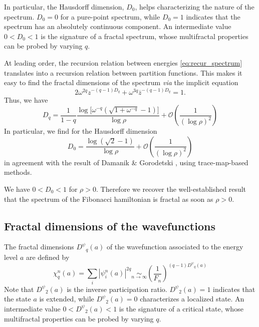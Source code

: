 \documentclass[aps,prl,preprint]{revtex4-1}
\newcommand{\simlim}[2]{\ensuremath{ \underset{#1 \rightarrow #2}{\sim} }}
\newcommand{\zb}{\ensuremath{\overline{z}}}
\newcommand{\wf}{\ensuremath{D^\psi}}
\begin{document}
In particular, the Hausdorff dimension, $D_0$, helps characterizing the nature of the spectrum. 
$D_0 = 0$ for a pure-point spectrum, while $D_0 = 1$ indicates that the spectrum has an absolutely continuous component.
An intermediate value $0 < D_0 < 1$ is the signature of a fractal spectrum, whose multifractal properties can be probed by varying $q$.

At leading order, the recursion relation between energies \eqref{eq:recur_spectrum} translates into a recursion relation between partition functions. 
This makes it easy to find the fractal dimensions of the spectrum \cite{Piechon95} \emph{via} the implicit equation
\begin{equation}
	\label{eq:spec}
	2 \omega^{2 q} z^{-(q-1)D_q}+\omega^{3 q} \zb^{-(q-1)D_q} = 1.
\end{equation}
Thus, we have
\begin{equation}
	D_q = \frac{1}{1-q} \frac{\log \big[\omega^{-q} \left( \sqrt{1+\omega^{-q}} -1\right) \big]}{\log \rho} + \mathcal{O}\left( \frac{1}{(\log \rho)^2} \right)
\end{equation}
In particular, we find for the Hausdorff dimension
\begin{equation}
	\label{eq:dqspec}
	D_0 = \frac{\log( \sqrt{2} -1 )}{\log \rho} + \mathcal{O}\left( \frac{1}{(\log \rho)^2} \right)
\end{equation}
in agreement with the result of Damanik \& Gorodetski \cite{DamanikGorodetski}, using trace-map-based methods.

We have $0 < D_0 < 1$ for $\rho > 0$. 
Therefore we recover the well-established result that the spectrum of the Fibonacci hamiltonian is fractal as soon as $\rho > 0$.

\subsection{Fractal dimensions of the wavefunctions}

The fractal dimensions $\wf_q(a)$ of the wavefunction associated to the energy level $a$ are defined by
\begin{equation}
	\chi_q^n(a) = \sum_i |\psi_i^n(a)|^{2q} \simlim{n}{\infty} \left( \frac{1}{F_n} \right)^{(q-1)\wf_q(a)}
\end{equation}
Note that $\wf_2(a)$ is the inverse participation ratio.
$\wf_2(a) = 1$ indicates that the state $a$ is extended, while $\wf_2(a) = 0$ characterizes a localized state.
An intermediate value $0 < \wf_2(a) < 1$ is the signature of a critical state, whose multifractal properties can be probed by varying $q$.
\end{document}
